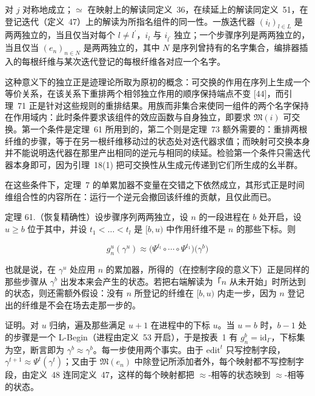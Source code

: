 对 \(j\) 对称地成立；\(\simeq\) 在映射上的解读同定义~36，在续延上的解读同定义~51，在登记迭代（定义~47）上的解读为所指名组件的同一性。一族迭代器 \(( i _ { l } ) _ { l \in L }\) 是两两独立的，当且仅当对每个 \({ \mathit { l } } \neq { \mathit { l } } ^ { \prime }\)，\(i _ { l }\) 与 \(i _ { l ^ { \prime } }\) 独立；一个步骤序列是两两独立的，当且仅当 \(( e _ { n } ) _ { n \in N }\) 是两两独立的，其中 \(N\) 是序列曾持有的名字集合，编排器插入的每根纤维与某次迭代登记的每根纤维各对应一个名字。

这种意义下的独立正是迹理论所取为原初的概念：可交换的作用在序列上生成一个等价关系，在该关系下重排两个相邻独立作用的顺序保持端点不变 {[}44{]}，而引理~71 正是针对这些规则的重排结果。用族而非集合来使同一组件的两个名字保持在作用域内：此时条件要求该组件的效应函数与自身独立，即要求 \(\mathfrak { M } ( i )\) 可交换。第一个条件是定理~61 所用到的，第二个则是定理~73 额外需要的：重排两根纤维的步骤，等于在另一根纤维移动过的状态处对迭代器求值；而映射可交换本身并不能说明迭代器在那里产出相同的逆元与相同的续延。检验第一个条件只需迭代器本身即可，因为引理~18(1) 把可交换性从生成元传递到它们所生成的幺半群。

在这些条件下，定理~7 的单累加器不变量在交错之下依然成立，其形式正是时间维组合性的内容所在：运行一个逆元会撤回该纤维的贡献，且仅此而已。

定理 61.（恢复精确性）设步骤序列两两独立，设 \(n\) 的一段进程在 \(b\) 处开启，设 \(u \geq b\) 位于其中，并设 \(t _ { 1 } < \dots < t _ { l }\) 是 \([ b , u )\) 中作用纤维不是 \(n\) 的那些下标。则

\[
g _ { n } ^ { u } ( \gamma ^ { u } ) \approx \big ( \Psi ^ { t _ { l } } \circ \dotsb \circ \Psi ^ { t _ { 1 } } \big ) \big ( \gamma ^ { b } \big )\tag{56}
\]

也就是说，在 \(\gamma ^ { u }\) 处应用 \(n\) 的累加器，所得的（在控制字段的意义下）正是同样的那些步骤从 \(\gamma ^ { b }\) 出发本来会产生的状态。若把右端解读为「\(n\) 从未开始」时所达到的状态，则还需额外假设：没有 \(n\) 所登记的纤维在 \([ b , u )\) 内走一步，因为 \(n\) 登记出的纤维是不会在场去走那一步的。

证明。对 \(u\) 归纳，遍及那些满足 \(u+1\) 在进程中的下标 \(u\)。当 \(u = b\) 时，\(b - 1\) 处的步骤是一个 L-Begin（进程由定义~53 开启），于是按表~1 有 \(g _ { n } ^ { b } = \mathrm { i d } _ { \Gamma }\)，下标集为空，断言即为 \(\gamma ^ { b } \approx \gamma ^ { b }\)。每一步使用两个事实。由于 \(\mathrm { e d i t } ^ { t }\) 只写控制字段，\(\gamma ^ { t + 1 } \approx \Psi ^ { t } ( \gamma ^ { t })\)；又由于 \(\mathfrak { M } ( e _ { n } )\) 中除登记所添加者外，每个映射都不写控制字段，由定义~48 连同定义~47，这样的每个映射都把 $\approx$-相等的状态映到 $\approx$-相等的状态。

